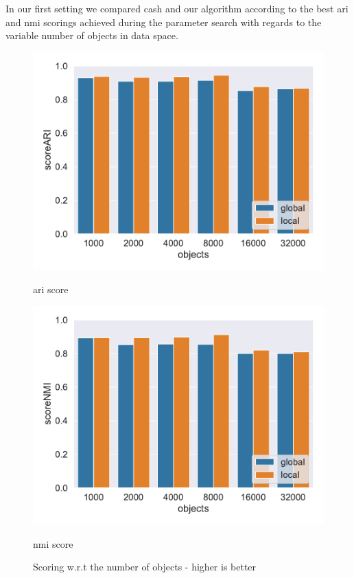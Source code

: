 In our first setting we compared \gls{cash} and our algorithm according to the best \gls{ari} and \gls{nmi} scorings achieved during the parameter search with regards to the variable number of objects in data space. 
\begin{figure}[h]
    \centering
    \begin{minipage}[t]{.5\textwidth}
      \centering  
      \captionsetup{width=.9\linewidth}
      \includegraphics[width=\textwidth]{evaluation/per_objects/Best_ARI_3D_N5_pobjects_bar.pdf}
      \captionsetup{labelformat=empty}
      \caption{\gls{ari} score}
      \label{fig:ariperpts}
    \end{minipage}%
    \begin{minipage}[t]{.5\textwidth}
      \centering
      \captionsetup{width=.9\linewidth}
      \includegraphics[width=\textwidth]{evaluation/per_objects/Best_NMI_3D_N5_pobjects_bar.pdf}
      \captionsetup{labelformat=empty}
      \caption{\gls{nmi} score}
      \label{fig:nmiperpts}
    \end{minipage}
    \caption{Scoring w.r.t the number of objects - higher is better}
    \label{fig:scoreperpts}
\end{figure}

